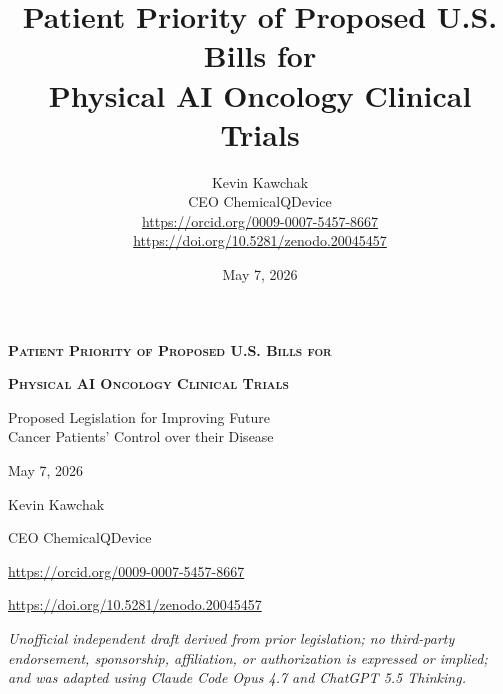 \documentclass[11pt,letterpaper]{article}
\title{Patient Priority of Proposed U.S. Bills for\\
Physical AI Oncology Clinical Trials}
\author{%
  Kevin Kawchak\\
  CEO ChemicalQDevice\\
  \url{https://orcid.org/0009-0007-5457-8667}\\
  \url{https://doi.org/10.5281/zenodo.20045457}
}
\date{May 7, 2026}
\newcommand{\subtitlestr}{Proposed Legislation for Improving Future\\Cancer Patients' Control over their Disease}
\begin{document}
\thispagestyle{empty}

\begin{center}
\vspace*{0.4in}

{\LARGE\bfseries\scshape Patient Priority of Proposed U.S. Bills for\par}
{\LARGE\bfseries\scshape Physical AI Oncology Clinical Trials\par}

\vspace{0.35in}

{\large \subtitlestr\par}

\vspace{0.40in}

{\normalsize May 7, 2026\par}

\vspace{0.10in}

{\normalsize Kevin Kawchak\par}

\vspace{0.10in}

{\normalsize CEO ChemicalQDevice\par}

\vspace{0.10in}

{\footnotesize \url{https://orcid.org/0009-0007-5457-8667}\par}

\vspace{0.10in}

{\normalsize \url{https://doi.org/10.5281/zenodo.20045457}\par}



\vspace{0.30in}
\end{center}

\begin{center}
\footnotesize
\textit{Unofficial independent draft derived from prior legislation; no
third-party endorsement, sponsorship, affiliation, or authorization is
expressed or implied; and was adapted using Claude Code Opus 4.7 and ChatGPT 5.5 Thinking.}
\end{center}
\end{document}
